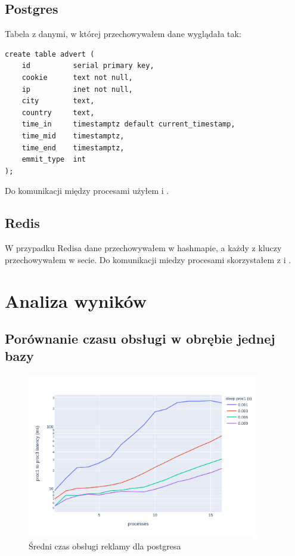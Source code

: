 \documentclass[polish, 10pt]{article}
\begin{document}
\subsection{Postgres}

Tabela z danymi, w której przechowywałem dane wyglądała tak:
\begin{commandline}
\begin{verbatim}
create table advert (
    id          serial primary key,
    cookie      text not null,
    ip          inet not null,
    city        text,
    country     text,
    time_in     timestamptz default current_timestamp,
    time_mid    timestamptz,
    time_end    timestamptz,
    emmit_type  int
);
\end{verbatim}
\end{commandline}

Do komunikacji między procesami użyłem  i .

\subsection{Redis}
W przypadku Redisa dane przechowywałem w hashmapie, a każdy z kluczy przechowywałem w secie. Do komunikacji miedzy procesami skorzystałem z  i .

\section{Analiza wyników}

\subsection{Porównanie czasu obsługi w obrębie jednej bazy}

\begin{figure}[H]
    \centering
    \includegraphics[width=0.9\textwidth]{./graphs/diff_in_end_postgres_all_sleeps.png}
    \caption{Średni czas obsługi reklamy dla postgresa}
\end{figure}
\end{document}
